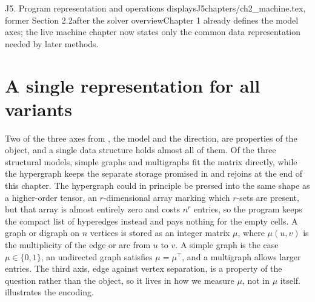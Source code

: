 \begin{offcut}{J5. Program representation and operations displays}{J5}{chapters/ch2\_machine.tex, former Section 2.2}{after the solver overview}{Chapter 1 already defines the model axes; the live machine chapter now states only the common data representation needed by later methods.}
\section{A single representation for all variants}
Two of the three axes from , the model and the direction, are properties of the object, and a single data structure holds almost all of them. Of the three structural models, simple graphs and multigraphs fit the matrix directly, while the hypergraph keeps the separate storage promised in  and rejoins at the end of this chapter. The hypergraph could in principle be pressed into the same shape as a higher-order tensor, an $r$-dimensional array marking which $r$-sets are present, but that array is almost entirely zero and costs $n^r$ entries, so the program keeps the compact list of hyperedges instead and pays nothing for the empty cells. A graph or digraph on $n$ vertices is stored as an integer matrix $\mu$, where $\mu(u, v)$ is the multiplicity of the edge or arc from $u$ to $v$. A simple graph is the case $\mu \in \{0, 1\}$, an undirected graph satisfies $\mu = \mu^{\top}$, and a multigraph allows larger entries. The third axis, edge against vertex separation, is a property of the question rather than the object, so it lives in how we measure $\mu$, not in $\mu$ itself.  illustrates the encoding.


\end{offcut}

